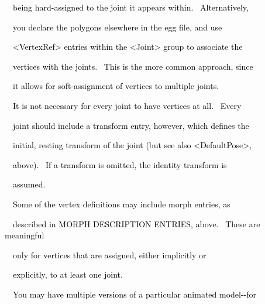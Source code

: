 \documentclass[a4paper]{article}
\newcommand\textstyleOOoComputerKeyWord[1]{\textrm{\textcolor[rgb]{0.0,0.0,0.5019608}{#1}}}
\begin{document}
{\color{black}
\textstyleOOoComputerKeyWord{\textcolor{black}{\ \ being hard-assigned to the joint it appears within.
\ Alternatively,}}}

{\color{black}
\textstyleOOoComputerKeyWord{\textcolor{black}{\ \ you declare the polygons elsewhere in the egg file, and use}}}

{\color{black}
\textstyleOOoComputerKeyWord{\textcolor{black}{\ \ {\textless}VertexRef{\textgreater} entries within the
{\textless}Joint{\textgreater} group to associate the}}}

{\color{black}
\textstyleOOoComputerKeyWord{\textcolor{black}{\ \ vertices with the joints. \ This is the more common approach,
since}}}

{\color{black}
\textstyleOOoComputerKeyWord{\textcolor{black}{\ \ it allows for soft-assignment of vertices to multiple joints.}}}


\bigskip

{\color{black}
\textstyleOOoComputerKeyWord{\textcolor{black}{\ \ It is not necessary for every joint to have vertices at all.
\ Every}}}

{\color{black}
\textstyleOOoComputerKeyWord{\textcolor{black}{\ \ joint should include a transform entry, however, which defines the}}}

{\color{black}
\textstyleOOoComputerKeyWord{\textcolor{black}{\ \ initial, resting transform of the joint (but see also
{\textless}DefaultPose{\textgreater},}}}

{\color{black}
\textstyleOOoComputerKeyWord{\textcolor{black}{\ \ above). \ If a transform is omitted, the identity transform is}}}

{\color{black}
\textstyleOOoComputerKeyWord{\textcolor{black}{\ \ assumed.}}}


\bigskip

{\color{black}
\textstyleOOoComputerKeyWord{\textcolor{black}{\ \ Some of the vertex definitions may include morph entries, as}}}

{\color{black}
\textstyleOOoComputerKeyWord{\textcolor{black}{\ \ described in MORPH DESCRIPTION ENTRIES, above. \ These are
meaningful}}}

{\color{black}
\textstyleOOoComputerKeyWord{\textcolor{black}{\ \ only for vertices that are assigned, either implicitly or}}}

{\color{black}
\textstyleOOoComputerKeyWord{\textcolor{black}{\ \ explicitly, to at least one joint.}}}


\bigskip

{\color{black}
\textstyleOOoComputerKeyWord{\textcolor{black}{\ \ You may have multiple versions of a particular animated
model-{}-for}}}
\end{document}
